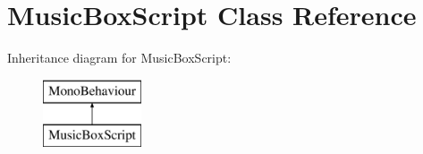\hypertarget{class_music_box_script}{}\section{Music\+Box\+Script Class Reference}
\label{class_music_box_script}
Inheritance diagram for Music\+Box\+Script\+:\begin{figure}[H]
\begin{center}
\leavevmode
\includegraphics[height=2.000000cm]{class_music_box_script}
\end{center}
\end{figure}
